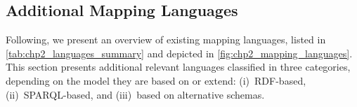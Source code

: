 



\subsection{Additional Mapping Languages}
\label{sec:chp2_more-languages}

Following, we present an overview of existing mapping languages, listed in \cref{tab:chp2_languages_summary} and depicted in  \cref{fig:chp2_mapping_languages}. This section presents additional relevant languages classified in three categories, depending on the model they are based on or extend: (i)~RDF-based, (ii)~SPARQL-based, and (iii)~based on alternative schemas.


